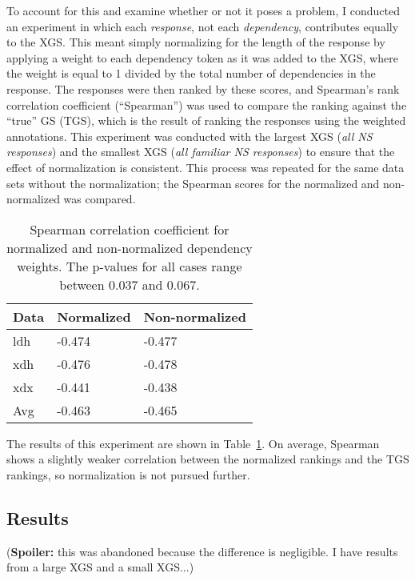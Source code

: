 To account for this and examine whether or not it poses a problem, I conducted an experiment in which each \textit{response}, not each \textit{dependency}, contributes equally to the XGS. This meant simply normalizing for the length of the response by applying a weight to each dependency token as it was added to the XGS, where the weight is equal to 1 divided by the total number of dependencies in the response. The responses were then ranked by these scores, and Spearman's rank correlation coefficient (``Spearman'') was used to compare the ranking against the ``true'' GS (TGS), which is the result of ranking the responses using the weighted annotations. This experiment was conducted with the largest XGS (\textit{all NS responses}) and the smallest XGS (\textit{all familiar NS responses}) to ensure that the effect of normalization is consistent. This process was repeated for the same data sets without the normalization; the Spearman scores for the normalized and non-normalized was compared.

\begin{table}[htb!]
\begin{center}
\begin{tabular}{|l|l|l|}
\hline
 Data & Normalized & Non-normalized \\
\hline
ldh & -0.474 & -0.477 \\
\hline
xdh & -0.476 & -0.478 \\
\hline
xdx & -0.441 & -0.438 \\
\hline
Avg & -0.463 & -0.465 \\
\hline
\end{tabular}
\caption{\label{tab:normalize-responses-spearman} Spearman correlation coefficient for normalized and non-normalized dependency weights. The p-values for all cases range between 0.037 and 0.067.}
\end{center}
\end{table}

The results of this experiment are shown in Table~\ref{tab:normalize-responses-spearman}. On average, Spearman shows a slightly weaker correlation between the normalized rankings and the TGS rankings, so normalization is not pursued further.

\subsection{Results}
\label{subsection:normalizing-length-results}
(\textbf{Spoiler:} this was abandoned because the difference is negligible. I have results from a large XGS and a small XGS...)

